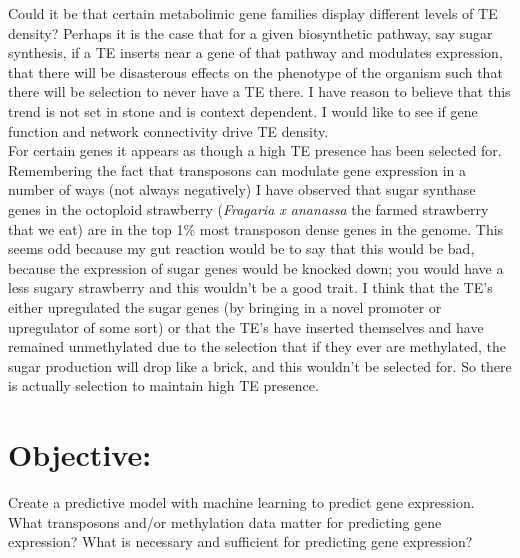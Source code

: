 \documentclass[12pt,letterpaper]{article}
\begin{document}
Could it be that certain metabolimic gene families display different levels of TE density? Perhaps it is the case that for a given biosynthetic pathway, say sugar synthesis, if a TE inserts near a gene of that pathway and modulates expression, that there will be disasterous effects on the phenotype of the organism such that there will be selection to never have a TE there. I have reason to believe that this trend is not set in stone and is context dependent. I would like to see if gene function and network connectivity drive TE density.\\

For certain genes it appears as though a high TE presence has been selected for. Remembering the fact that transposons can modulate gene expression in a number of ways (not always negatively) I have observed that sugar synthase genes in the octoploid strawberry (\textit{Fragaria x ananassa} the farmed strawberry that we eat) are in the top 1\% most transposon dense genes in the genome. This seems odd because my gut reaction would be to say that this would be bad, because the expression of sugar genes would be knocked down; you would have a less sugary strawberry and this wouldn't be a good trait. I think that the TE's either upregulated the sugar genes (by bringing in a novel promoter or upregulator of some sort) or that the TE's have inserted themselves and have remained unmethylated due to the selection that if they ever are methylated, the sugar production will drop like a brick, and this wouldn't be selected for. So there is actually selection to maintain high TE presence.

\section*{Objective:}
Create a predictive model with machine learning to predict gene expression. What transposons and/or methylation data matter for predicting gene expression? What is necessary and sufficient for predicting gene expression?



















\end{document}
